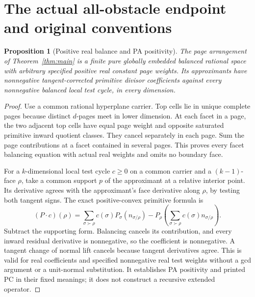 \documentclass[11pt]{article}
\newtheorem{proposition}[theorem]{Proposition}
\begin{document}
\section{The actual all-obstacle endpoint and original conventions}
\begin{proposition}[Positive real balance and PA positivity]\label{prop:balance}
The page arrangement of Theorem~\ref{thm:main} is a finite pure globally embedded balanced rational space with arbitrary specified positive real constant page weights. Its approximants have nonnegative tangent-corrected primitive divisor coefficients against every nonnegative balanced local test cycle, in every dimension.
\end{proposition}
\begin{proof}
Use a common rational hyperplane carrier. Top cells lie in unique complete pages because distinct $d$-pages meet in lower dimension. At each facet in a page, the two adjacent top cells have equal page weight and opposite saturated primitive inward quotient classes. They cancel separately in each page. Sum the page contributions at a facet contained in several pages. This proves every facet balancing equation with actual real weights and omits no boundary face.

For a $k$-dimensional local test cycle $c\geq0$ on a common carrier and a $(k-1)$-face $\rho$, take a common support $p$ of the approximant at a relative interior point. Its derivative agrees with the approximant's face derivative along $\rho$, by testing both tangent signs. The exact positive-convex primitive formula is
\[
(P\cdot c)(\rho)=\sum_{\sigma\succ\rho}c(\sigma)P_\sigma(n_{\sigma/\rho})
-P_\rho\!\left(\sum_{\sigma\succ\rho}c(\sigma)n_{\sigma/\rho}\right).
\]
Subtract the supporting form. Balancing cancels its contribution, and every inward residual derivative is nonnegative, so the coefficient is nonnegative. A tangent change of normal lift cancels because tangent derivatives agree. This is valid for real coefficients and specified nonnegative real test weights without a gcd argument or a unit-normal substitution. It establishes PA positivity and printed PC in their fixed meanings; it does not construct a recursive extended operator.
\end{proof}
\end{document}
